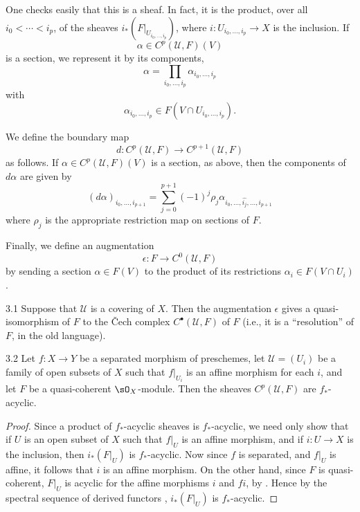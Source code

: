 One checks easily that this is a sheaf. In fact, it is the product, over all $i_0<\cdots<i_p$, of the sheaves $i_*(F|_{U_{i_0,\dots,i_p}})$, where $i\colon U_{i_0,\dots,i_p}\to X$ is the inclusion. If
\[
\alpha \in C^p(\mathcal{U},F)(V)
\]
is a section, we represent it by its components,
\[
\alpha = \prod_{i_0,\dots,i_p} \alpha_{i_0,\dots,i_p}
\]
with
\[
\alpha_{i_0,\dots,i_p} \in F(V\cap U_{i_0,\dots,i_p}).
\]

We define the boundary map
\[
d\colon C^p(\mathcal{U},F) \longrightarrow C^{p+1}(\mathcal{U},F)
\]
as follows. If $\alpha\in C^p(\mathcal{U},F)(V)$ is a section, as above, then the components of $d\alpha$ are given by
\[
(d\alpha)_{i_0,\dots,i_{p+1}} = \sum_{j=0}^{p+1} (-1)^j \rho_j \alpha_{i_0,\dots,\widehat{i_j},\dots,i_{p+1}}
\]
where $\rho_j$ is the appropriate restriction map on sections of $F$.

Finally, we define an augmentation
\[
\epsilon\colon F \longrightarrow C^0(\mathcal{U},F)
\]
by sending a section $\alpha\in F(V)$ to the product of its restrictions $\alpha_i\in F(V\cap U_i)$.

\begin{bookproposition}{3.1}\label{prop:3.3.1}
\cite[\nopp II,~5.2.1]{G} Suppose that $\mathcal{U}$ is a covering of $X$. Then the augmentation $\epsilon$ gives a quasi-isomorphism of $F$ to the \v{C}ech complex $C^\bullet(\mathcal{U},F)$ of $F$ (i.e., it is a ``resolution'' of $F$, in the old language).
\end{bookproposition}

\begin{bookproposition}{3.2}\label{prop:3.3.2}
Let $f\colon X\to Y$ be a separated morphism of preschemes, let $\mathcal{U}=(U_i)$ be a family of open subsets of $X$ such that $f|_{U_i}$ is an affine morphism for each $i$, and let $F$ be a quasi-coherent $\sO_X$-module. Then the sheaves $C^p(\mathcal{U},F)$ are $f_*$-acyclic.
\end{bookproposition}

\begin{proof}
Since a product of $f_*$-acyclic sheaves is $f_*$-acyclic, we need only show that if $U$ is an open subset of $X$ such that $f|_U$ is an affine morphism, and if $i\colon U\to X$ is the inclusion, then $i_*(F|_U)$ is $f_*$-acyclic. Now since $f$ is separated, and $f|_U$ is affine, it follows that $i$ is an affine morphism. On the other hand, since $F$ is quasi-coherent, $F|_U$ is acyclic for the affine morphisms $i$ and $fi$, by \cite[\nopp III,~1.3.2]{EGA}. Hence by the spectral sequence of derived functors , $i_*(F|_U)$ is $f_*$-acyclic.
\end{proof}

